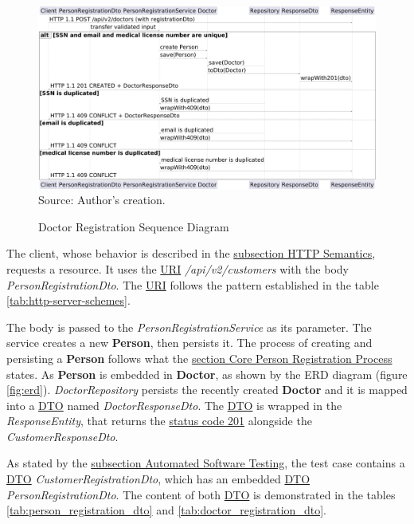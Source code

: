\begin{figure}[H]
	\centering
	\caption{Doctor Registration Sequence Diagram}
	\includegraphics[width=1\linewidth]{figures/doctor_registration_sequence_diagram.png}
	\\ \footnotesize Source: Author's creation.
	\label{fig:doctor_registration_sequence_diagram}
\end{figure}

The client, whose behavior is described in the \hyperref[subsection:http_semantics]{subsection HTTP Semantics}, requests a resource. It uses the \hyperref[appendix:glossary]{URI} \textit{/api/v2/customers} with the body \textit{PersonRegistrationDto}. The \hyperref[appendix:glossary]{URI} follows the pattern established  in the table \ref{tab:http-server-schemes}.

The body is passed to the \textit{PersonRegistrationService} as its parameter. The service creates a new \textbf{Person}, then persists it. The process of creating and persisting a \textbf{Person} follows what the \hyperref[core_person_registration_process]{section Core Person Registration Process} states.
As \textbf{Person} is embedded in \textbf{Doctor}, as shown by the ERD diagram (figure \ref{fig:erd}). \textit{DoctorRepository} persists the recently created \textbf{Doctor} and it is mapped into a \hyperref[appendix:glossary]{DTO} named \textit{DoctorResponseDto}. The \hyperref[appendix:glossary]{DTO} is wrapped in the \textit{ResponseEntity}, that returns the \hyperref[tab:summary_http_status_codes]{status code 201} alongside the \textit{CustomerResponseDto}.

As stated by the \hyperref[subsection:automated_software_testing]{subsection Automated Software Testing}, the test case contains a \hyperref[appendix:glossary]{DTO} \textit{CustomerRegistrationDto}, which has an embedded \hyperref[appendix:glossary]{DTO} \textit{PersonRegistrationDto}. The content of both \hyperref[appendix:glossary]{DTO} is demonstrated in the tables \ref{tab:person_registration_dto} and \ref{tab:doctor_registration_dto}.


